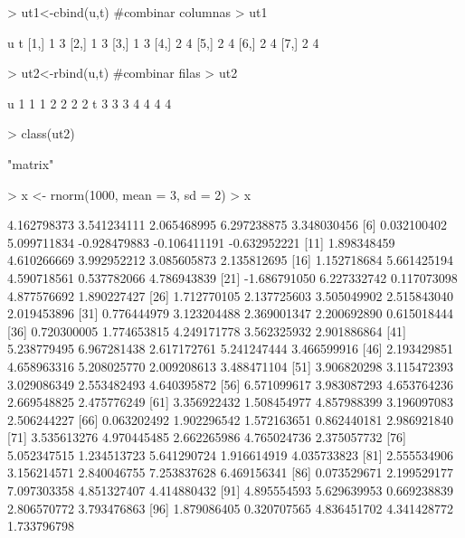 \documentclass[12pt]{article}
\begin{document}
\begin{Schunk}
\begin{Soutput}
\end{Soutput}
\begin{Sinput}
> ut1<-cbind(u,t) #combinar columnas
> ut1
\end{Sinput}
\begin{Soutput}
     u t
[1,] 1 3
[2,] 1 3
[3,] 1 3
[4,] 2 4
[5,] 2 4
[6,] 2 4
[7,] 2 4
\end{Soutput}
\begin{Sinput}
> ut2<-rbind(u,t) #combinar filas
> ut2
\end{Sinput}
\begin{Soutput}
  [,1] [,2] [,3] [,4] [,5] [,6] [,7]
u    1    1    1    2    2    2    2
t    3    3    3    4    4    4    4
\end{Soutput}
\begin{Sinput}
> class(ut2)
\end{Sinput}
\begin{Soutput}
[1] "matrix"
\end{Soutput}
\begin{Sinput}
> x <- rnorm(1000, mean = 3, sd = 2) 
> x
\end{Sinput}
\begin{Soutput}
   [1]  4.162798373  3.541234111  2.065468995  6.297238875  3.348030456
   [6]  0.032100402  5.099711834 -0.928479883 -0.106411191 -0.632952221
  [11]  1.898348459  4.610266669  3.992952212  3.085605873  2.135812695
  [16]  1.152718684  5.661425194  4.590718561  0.537782066  4.786943839
  [21] -1.686791050  6.227332742  0.117073098  4.877576692  1.890227427
  [26]  1.712770105  2.137725603  3.505049902  2.515843040  2.019453896
  [31]  0.776444979  3.123204488  2.369001347  2.200692890  0.615018444
  [36]  0.720300005  1.774653815  4.249171778  3.562325932  2.901886864
  [41]  5.238779495  6.967281438  2.617172761  5.241247444  3.466599916
  [46]  2.193429851  4.658963316  5.208025770  2.009208613  3.488471104
  [51]  3.906820298  3.115472393  3.029086349  2.553482493  4.640395872
  [56]  6.571099617  3.983087293  4.653764236  2.669548825  2.475776249
  [61]  3.356922432  1.508454977  4.857988399  3.196097083  2.506244227
  [66]  0.063202492  1.902296542  1.572163651  0.862440181  2.986921840
  [71]  3.535613276  4.970445485  2.662265986  4.765024736  2.375057732
  [76]  5.052347515  1.234513723  5.641290724  1.916614919  4.035733823
  [81]  2.555534906  3.156214571  2.840046755  7.253837628  6.469156341
  [86]  0.073529671  2.199529177  7.097303358  4.851327407  4.414880432
  [91]  4.895554593  5.629639953  0.669238839  2.806570772  3.793476863
  [96]  1.879086405  0.320707565  4.836451702  4.341428772  1.733796798

\end{Soutput}
\end{Schunk}
\end{document}
